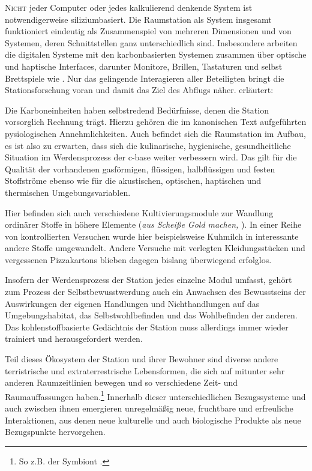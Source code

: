 \begin{newstuff}
    \lettrine{N}{icht} jeder Computer oder jedes kalkulierend denkende System ist notwendigerweise siliziumbasiert. Die Raumstation als System insgesamt funktioniert eindeutig als Zusammenspiel von mehreren Dimensionen und von Systemen, deren Schnittstellen ganz unterschiedlich sind. Insbesondere arbeiten die digitalen Systeme mit den karbonbasierten Systemen zusammen über optische und haptische Interfaces, darunter Monitore, Brillen, Tastaturen und selbst Brettspiele wie . Nur das gelingende Interagieren aller Beteiligten bringt die Stationsforschung voran und damit das Ziel des Abflugs näher. \cite[S. 169]{cbasebook} erläutert:

    
    Die Karboneinheiten haben selbstredend Bedürfnisse, denen die Station vorsorglich Rechnung trägt.
    Hierzu gehören die im kanonischen Text aufgeführten pysiologischen Annehmlichkeiten. Auch befindet sich die  Raumstation im Aufbau, es ist also zu erwarten, dass sich die kulinarische, hygienische, gesundheitliche Situation im Werdensprozess der c-base weiter verbessern wird. Das gilt für die Qualität der vorhandenen gasförmigen, flüssigen, halbflüssigen und festen Stoffströme ebenso wie für die akustischen, optischen, haptischen und thermischen Umgebungsvariablen. 

    Hier befinden sich auch verschiedene Kultivierungsmodule zur Wandlung ordinärer Stoffe in höhere Elemente (\emph{aus Scheiße Gold machen,} ). In einer Reihe von kontrollierten Versuchen wurde hier beispielsweise Kuhmilch in interessante andere Stoffe umgewandelt. Andere Versuche mit verlegten Kleidungsstücken und vergessenen \mbox{Pizza}\-kartons blieben dagegen bislang überwiegend erfolglos.
  
    Insofern der Werdensprozess der Station jedes einzelne Modul umfasst, gehört zum Prozess der Selbstbewusstwerdung auch ein Anwachsen des Bewusstseins der Auswirkungen der eigenen Handlungen und Nichthandlungen auf das Umgebungshabitat, das Selbstwohlbefinden und das Wohlbefinden der anderen. Das kohlenstoffbasierte Gedächtnis der Station muss allerdings immer wieder trainiert und herausgefordert werden.

    Teil dieses Ökosystem der Station und ihrer Bewohner sind diverse andere terristrische und extraterrestrische Lebensformen, die sich auf mitunter sehr anderen Raumzeitlinien bewegen und so verschiedene Zeit- und Raumauffassungen haben.\footnote{So z.B. der Symbiont \cite{symbiont}.} Innerhalb dieser unterschiedlichen Bezugssysteme und auch zwischen ihnen emergieren unregelmäßig neue, fruchtbare und erfreuliche Interaktionen, aus denen neue kulturelle und auch biologische Produkte als neue Bezugspunkte hervorgehen. 


\end{newstuff}
